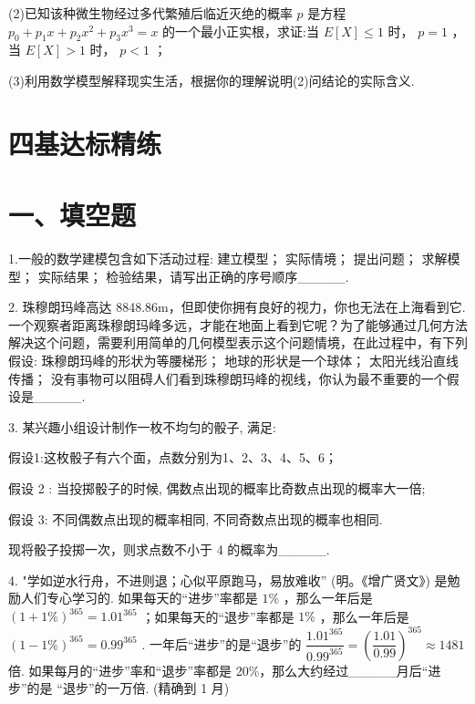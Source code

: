 (2)已知该种微生物经过多代繁殖后临近灭绝的概率 $p$ 是方程 ${p}_{0} + {p}_{1}x + {p}_{2}{x}^{2} + {p}_{3}{x}^{3} = x$ 的一个最小正实根，求证:当 $E\left\lbrack  X\right\rbrack   \leq  1$ 时， $p = 1$ ，当 $E\left\lbrack  X\right\rbrack   > 1$ 时， $p < 1$ ；

(3)利用数学模型解释现实生活，根据你的理解说明(2)问结论的实际含义.

\section*{四基达标精练}

\section*{一、填空题}

1.一般的数学建模包含如下活动过程:  建立模型；  实际情境；  提出问题；  求解模型；  实际结果；   检验结果，请写出正确的序号顺序\_\_\_\_\_.

2. 珠穆朗玛峰高达 8848.86m，但即使你拥有良好的视力，你也无法在上海看到它. 一个观察者距离珠穆朗玛峰多远，才能在地面上看到它呢？为了能够通过几何方法解决这个问题，需要利用简单的几何模型表示这个问题情境，在此过程中，有下列假设:   珠穆朗玛峰的形状为等腰梯形；   地球的形状是一个球体；   太阳光线沿直线传播；  没有事物可以阻碍人们看到珠穆朗玛峰的视线，你认为最不重要的一个假设是\_\_\_\_\_.

3. 某兴趣小组设计制作一枚不均匀的骰子, 满足:

假设1:这枚骰子有六个面，点数分别为1、2、3、4、5、6；

假设 2 : 当投掷骰子的时候, 偶数点出现的概率比奇数点出现的概率大一倍;

假设 3: 不同偶数点出现的概率相同, 不同奇数点出现的概率也相同.

现将骰子投掷一次，则求点数不小于 4 的概率为\_\_\_\_\_.

4. "学如逆水行舟，不进则退；心似平原跑马，易放难收” (明。《增广贤文》) 是勉励人们专心学习的. 如果每天的“进步”率都是 $1\%$ ，那么一年后是 ${\left( 1 + 1\% \right) }^{365} = {1.01}^{365}$ ；如果每天的“退步”率都是 $1\%$ ，那么一年后是 ${\left( 1 - 1\% \right) }^{365} = {0.99}^{365}$ . 一年后“进步”的是“退步”的 $\dfrac{{1.01}^{365}}{{0.99}^{365}} = {\left( \dfrac{1.01}{0.99}\right) }^{365} \approx  {1481}$ 倍. 如果每月的“进步”率和“退步”率都是 20\%，那么大约经过\_\_\_\_\_月后“进步”的是 “退步”的一万倍. (精确到 1 月)


